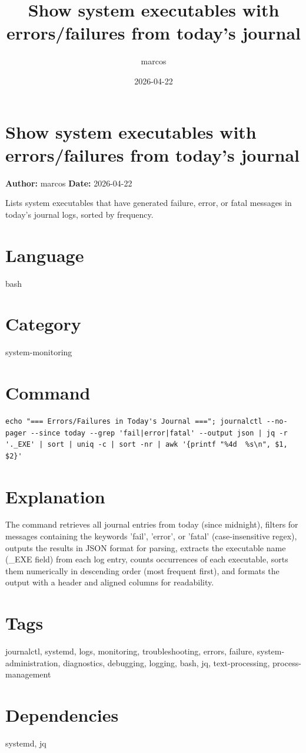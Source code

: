 \documentclass{article}
\title{Show system executables with errors/failures from today's journal}
\author{marcos}
\date{2026-04-22}
\begin{document}
\section*{Show system executables with errors/failures from today's journal}
\textbf{Author:} marcos \hfill \textbf{Date:} 2026-04-22

\noindent Lists system executables that have generated failure, error, or fatal messages in today's journal logs, sorted by frequency.

\section*{Language}
bash

\section*{Category}
system-monitoring

\section*{Command}
\begin{lstlisting}
echo "=== Errors/Failures in Today's Journal ==="; journalctl --no-pager --since today --grep 'fail|error|fatal' --output json | jq -r '._EXE' | sort | uniq -c | sort -nr | awk '{printf "%4d  %s\n", $1, $2}'
\end{lstlisting}

\section*{Explanation}
The command retrieves all journal entries from today (since midnight), filters for messages containing the keywords 'fail', 'error', or 'fatal' (case-insensitive regex), outputs the results in JSON format for parsing, extracts the executable name (\_EXE field) from each log entry, counts occurrences of each executable, sorts them numerically in descending order (most frequent first), and formats the output with a header and aligned columns for readability.

\section*{Tags}
journalctl, systemd, logs, monitoring, troubleshooting, errors, failure, system-administration, diagnostics, debugging, logging, bash, jq, text-processing, process-management

\section*{Dependencies}
systemd, jq
\end{document}
